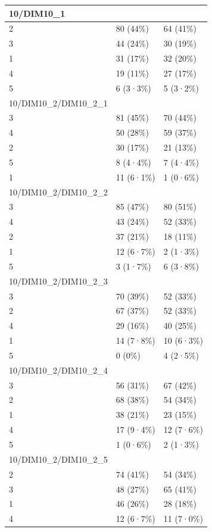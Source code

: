 \documentclass[
]{book}
\begin{document}
\begin{tabular}{l|l|l}
\hline
10/DIM10\_1 &  & \\
\hline
2 & 80 (44\%) & 64 (41\%)\\
\hline
3 & 44 (24\%) & 30 (19\%)\\
\hline
1 & 31 (17\%) & 32 (20\%)\\
\hline
4 & 19 (11\%) & 27 (17\%)\\
\hline
5 & 6 (3·3\%) & 5 (3·2\%)\\
\hline
10/DIM10\_2/DIM10\_2\_1 &  & \\
\hline
3 & 81 (45\%) & 70 (44\%)\\
\hline
4 & 50 (28\%) & 59 (37\%)\\
\hline
2 & 30 (17\%) & 21 (13\%)\\
\hline
5 & 8 (4·4\%) & 7 (4·4\%)\\
\hline
1 & 11 (6·1\%) & 1 (0·6\%)\\
\hline
10/DIM10\_2/DIM10\_2\_2 &  & \\
\hline
3 & 85 (47\%) & 80 (51\%)\\
\hline
4 & 43 (24\%) & 52 (33\%)\\
\hline
2 & 37 (21\%) & 18 (11\%)\\
\hline
1 & 12 (6·7\%) & 2 (1·3\%)\\
\hline
5 & 3 (1·7\%) & 6 (3·8\%)\\
\hline
10/DIM10\_2/DIM10\_2\_3 &  & \\
\hline
3 & 70 (39\%) & 52 (33\%)\\
\hline
2 & 67 (37\%) & 52 (33\%)\\
\hline
4 & 29 (16\%) & 40 (25\%)\\
\hline
1 & 14 (7·8\%) & 10 (6·3\%)\\
\hline
5 & 0 (0\%) & 4 (2·5\%)\\
\hline
10/DIM10\_2/DIM10\_2\_4 &  & \\
\hline
3 & 56 (31\%) & 67 (42\%)\\
\hline
2 & 68 (38\%) & 54 (34\%)\\
\hline
1 & 38 (21\%) & 23 (15\%)\\
\hline
4 & 17 (9·4\%) & 12 (7·6\%)\\
\hline
5 & 1 (0·6\%) & 2 (1·3\%)\\
\hline
10/DIM10\_2/DIM10\_2\_5 &  & \\
\hline
2 & 74 (41\%) & 54 (34\%)\\
\hline
3 & 48 (27\%) & 65 (41\%)\\
\hline
1 & 46 (26\%) & 28 (18\%)\\
\hline
4 & 12 (6·7\%) & 11 (7·0\%)\\

\end{tabular}
\end{document}
